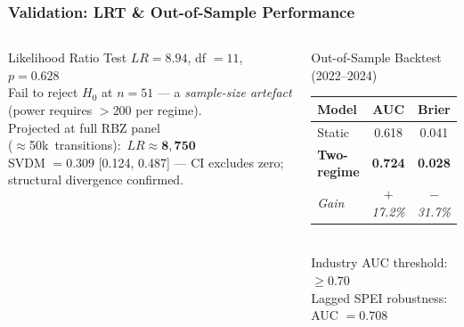 \documentclass{beamer}
\newcommand{\ts}{\footnotesize}
\begin{document}
\begin{frame}
    \frametitle{Validation: LRT \& Out-of-Sample Performance}
    \begin{columns}[T]
    \begin{block}{Likelihood Ratio Test}
    \small
    $LR = 8.94$, df $= 11$, $p = 0.628$\\[0.3em]
    Fail to reject $H_0$ at $n=51$ --- a \textit{sample-size artefact} (power requires $>$200 per regime).\\[0.3em]
    Projected at full RBZ panel\\\mbox{($\approx$50k transitions): $LR \approx \mathbf{8{,}750}$}\\[0.3em]
    SVDM $= 0.309$ [0.124, 0.487] --- CI excludes zero; structural divergence confirmed.
    \end{block}
    \begin{block}{Out-of-Sample Backtest (2022--2024)}
    \ts
    \begin{tabular}{@{}lcc@{}}
        \toprule
        Model & AUC & Brier \\
        \midrule
        Static & 0.618 & 0.041 \\
        \textbf{Two-regime} & \textbf{0.724} & \textbf{0.028} \\
        \textit{Gain} & \textit{$+$17.2\%} & \textit{$-$31.7\%} \\
        \bottomrule
    \end{tabular}
    \vspace{0.3em}\\
    \scriptsize Industry AUC threshold: $\geq 0.70$\\
    Lagged SPEI robustness: AUC $= 0.708$
    \end{block}
    \end{columns}
\end{frame}
\end{document}
